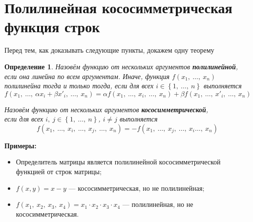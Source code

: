 \documentclass[a4paper,12pt]{article}
\newtheorem*{definition}{Определение}
\begin{document}
	\section*{Полилинейная кососимметрическая функция строк}
	
	Перед тем, как доказывать следующие пункты, докажем одну теорему
	\begin{definition}
		Назовём функцию от нескольких аргументов \textbf{полилинейной}, если она линейна по всем аргументам. Иначе, функция $f(x_1,\ \ldots,\ x_n)$ полилинейна тогда и только тогда, если для всех $i \in \left\{ 1,\ \ldots,\ n \right\}$ выполняется
		\[
		f(x_1,\ \ldots,\ \alpha x_i + \beta x'_i,\ \ldots ,\ x_n) = \alpha f(x_1,\ \ldots,\ x_i,\ \ldots ,\ x_n) + \beta f(x_1,\ \ldots,\ x'_i,\ \ldots ,\ x_n)
		\]
		
		Назовём функцию от нескольких аргументов \textbf{кососимметрической},\\ если для всех $i,\ j \in \left\{ 1,\ \ldots,\ n \right\}$, $i \neq j$ выполняется
		\[
		f(x_1,\ \ldots,\ x_i ,\ \ldots,\ x_j,\ \ldots ,\ x_n) = -f(x_1,\ \ldots,\ x_j,\ \ldots,\ x_i \ldots ,\ x_n)
		\]
	\end{definition}
	\textbf{Примеры:}
	\begin{itemize}
		\item Определитель матрицы является полилинейной кососимметрической функцией от строк матрицы;
		\item $f(x, y) = x-y$ --- кососимметрическая, но не полилинейная;
		\item $f(x_1,\ x_2,\ x_3,\ x_4) = x_1\cdot x_2\cdot x_3\cdot x_4$ --- полилинейная, но не кососимметрическая.
	\end{itemize}
	
\end{document}
